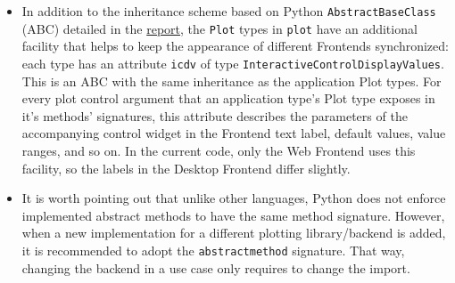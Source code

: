 \begin{itemize}
\tightlist
\item
  In addition to the inheritance scheme based on Python
  \texttt{AbstractBaseClass} (ABC) detailed in the
  \href{./doc/report.pdf}{report}, the \texttt{Plot} types in
  \texttt{plot} have an additional facility that helps to keep the
  appearance of different Frontends synchronized: each type has an
  attribute \texttt{icdv} of type
  \texttt{InteractiveControlDisplayValues}. This is an ABC with the same
  inheritance as the application Plot types. For every plot control
  argument that an application type's Plot type exposes in it's methods'
  signatures, this attribute describes the parameters of the
  accompanying control widget in the Frontend text label, default
  values, value ranges, and so on. In the current code, only the Web
  Frontend uses this facility, so the labels in the Desktop Frontend
  differ slightly.\\
\item
  It is worth pointing out that unlike other languages, Python does not
  enforce implemented abstract methods to have the same method
  signature. However, when a new implementation for a different plotting
  library/backend is added, it is recommended to adopt the
  \texttt{abstractmethod} signature. That way, changing the backend in a
  use case only requires to change the import.
\end{itemize}




\hdashrule{\textwidth}{2pt}{2pt}









